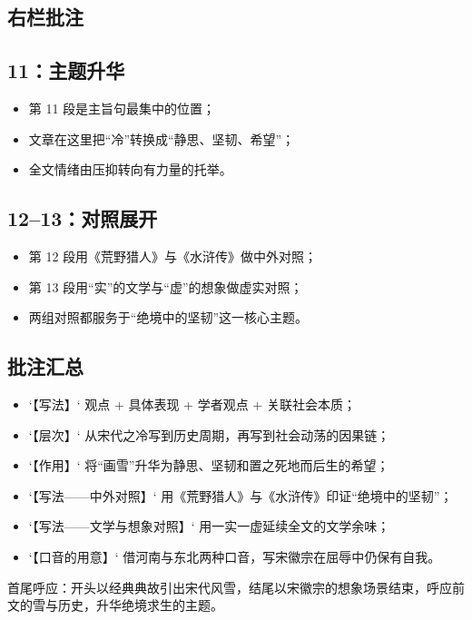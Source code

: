\begin{handoutlayout}
\section*{右栏批注}

\begin{structurebox}
\subsection*{11：主题升华}
\begin{itemize}[leftmargin=*]
    \item 第 11 段是主旨句最集中的位置；
    \item 文章在这里把“冷”转换成“静思、坚韧、希望”；
    \item 全文情绪由压抑转向有力量的托举。
\end{itemize}
\end{structurebox}

\begin{summarybox}
\subsection*{12--13：对照展开}
\begin{itemize}[leftmargin=*]
    \item 第 12 段用《荒野猎人》与《水浒传》做中外对照；
    \item 第 13 段用“实”的文学与“虚”的想象做虚实对照；
    \item 两组对照都服务于“绝境中的坚韧”这一核心主题。
\end{itemize}
\end{summarybox}

\begin{techbox}
\subsection*{批注汇总}
\begin{itemize}[leftmargin=*]
    \item `【写法】` 观点 + 具体表现 + 学者观点 + 关联社会本质；
    \item `【层次】` 从宋代之冷写到历史周期，再写到社会动荡的因果链；
    \item `【作用】` 将“画雪”升华为静思、坚韧和置之死地而后生的希望；
    \item `【写法——中外对照】` 用《荒野猎人》与《水浒传》印证“绝境中的坚韧”；
    \item `【写法——文学与想象对照】` 用一实一虚延续全文的文学余味；
    \item `【口音的用意】` 借河南与东北两种口音，写宋徽宗在屈辱中仍保有自我。
\end{itemize}
\end{techbox}

\begin{keyquote}

首尾呼应：开头以经典典故引出宋代风雪，结尾以宋徽宗的想象场景结束，呼应前文的雪与历史，升华绝境求生的主题。
\end{keyquote}

\end{handoutlayout}

